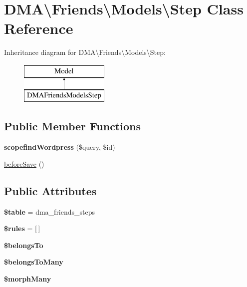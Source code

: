 \hypertarget{classDMA_1_1Friends_1_1Models_1_1Step}{}\section{D\+M\+A\textbackslash{}Friends\textbackslash{}Models\textbackslash{}Step Class Reference}
\label{classDMA_1_1Friends_1_1Models_1_1Step}
Inheritance diagram for D\+M\+A\textbackslash{}Friends\textbackslash{}Models\textbackslash{}Step\+:\begin{figure}[H]
\begin{center}
\leavevmode
\includegraphics[height=2.000000cm]{d9/d03/classDMA_1_1Friends_1_1Models_1_1Step}
\end{center}
\end{figure}
\subsection*{Public Member Functions}
\begin{DoxyCompactItemize}
\item 
\hypertarget{classDMA_1_1Friends_1_1Models_1_1Step_a58a71b1c9b39249ac24484bbd2307db2}{}{\bfseries scopefind\+Wordpress} (\$query, \$id)\label{classDMA_1_1Friends_1_1Models_1_1Step_a58a71b1c9b39249ac24484bbd2307db2}

\item 
\hyperlink{classDMA_1_1Friends_1_1Models_1_1Step_abed223d05f52e5e39b0991929695cee9}{before\+Save} ()
\end{DoxyCompactItemize}
\subsection*{Public Attributes}
\begin{DoxyCompactItemize}
\item 
\hypertarget{classDMA_1_1Friends_1_1Models_1_1Step_a73a0d48cb46b1aeeaad83499e8449acc}{}{\bfseries \$table} = \textquotesingle{}dma\+\_\+friends\+\_\+steps\textquotesingle{}\label{classDMA_1_1Friends_1_1Models_1_1Step_a73a0d48cb46b1aeeaad83499e8449acc}

\item 
\hypertarget{classDMA_1_1Friends_1_1Models_1_1Step_a13476d5ca718080b85c9633270bf4942}{}{\bfseries \$rules} = \mbox{[}$\,$\mbox{]}\label{classDMA_1_1Friends_1_1Models_1_1Step_a13476d5ca718080b85c9633270bf4942}

\item 
{\bfseries \$belongs\+To}
\item 
{\bfseries \$belongs\+To\+Many}
\item 
{\bfseries \$morph\+Many}
\end{DoxyCompactItemize}
